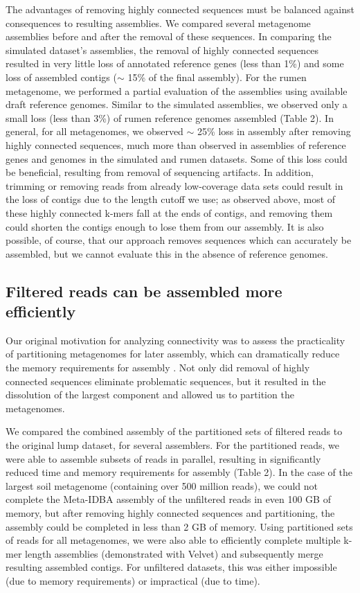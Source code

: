 \documentclass[10pt]{article}
\begin{document}
The advantages of removing highly connected sequences must be balanced
against consequences to resulting assemblies.  We compared several
metagenome assemblies before and after the removal of these sequences.
In comparing the simulated dataset's assemblies, the removal of highly
connected sequences resulted in very little loss of annotated
reference genes (less than 1\%) and some loss of assembled contigs
($\sim$ 15\% of the final assembly).  For the rumen metagenome, we
performed a partial evaluation of the assemblies using available draft
reference genomes.  Similar to the simulated assemblies, we observed
only a small loss (less than 3\%) of rumen reference genomes assembled
(Table 2).  In general, for all metagenomes, we observed $\sim$ 25\%
loss in assembly after removing highly connected sequences, much more
than observed in assemblies of reference genes and genomes in the
simulated and rumen datasets.  Some of this loss could be beneficial,
resulting from removal of sequencing artifacts.  In addition, trimming
or removing reads from already low-coverage data sets could result in
the loss of contigs due to the length cutoff we use; as observed
above, most of these highly connected k-mers fall at the ends of
contigs, and removing them could shorten the contigs enough to lose
them from our assembly.  It is also possible, of course, that our
approach removes sequences which can accurately be assembled, but we
cannot evaluate this in the absence of reference genomes.

\subsection*{Filtered reads can be assembled more efficiently}

Our original motivation for analyzing connectivity was to assess the
practicality of partitioning metagenomes for later assembly, which can
dramatically reduce the memory requirements for assembly
\cite{Pell:2012cq}.  Not only did removal of highly connected sequences
eliminate problematic sequences, but it resulted in the dissolution
of the largest component and allowed us to partition the metagenomes.

We compared the combined assembly of the partitioned sets of filtered
reads to the original lump dataset, for several assemblers.  For the
partitioned reads, we were able to assemble subsets of reads in
parallel, resulting in significantly reduced time and memory
requirements for assembly (Table 2).  In the case of the largest soil
metagenome (containing over 500 million reads), we could not complete
the Meta-IDBA assembly of the unfiltered reads in even 100 GB of
memory, but after removing highly connected sequences and
partitioning, the assembly could be completed in less than 2 GB of
memory.  Using partitioned sets of reads for all metagenomes, we were
also able to efficiently complete multiple k-mer length assemblies
(demonstrated with Velvet) and subsequently merge resulting assembled
contigs.  For unfiltered datasets, this was either impossible (due to
memory requirements) or impractical (due to time).
\end{document}
